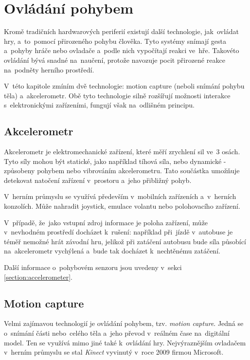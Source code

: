 \documentclass[thesis=B,czech,hidelinks]{FITthesis}[2012/06/26] %
\begin{document}
\section{Ovládání pohybem}

Kromě tradičních hardwarových periferií existují další technologie, jak~ovládat hry, a~to~pomocí přirozeného pohybu člověka. Tyto systémy snímají gesta a~pohyby hráče nebo ovladače a~podle nich vypočítají reakci ve~hře. Takovéto ovládání bývá snadné na~naučení, protože navozuje pocit přirozené reakce na~podněty herního prostředí.

V~této kapitole zmíním dvě technologie: motion capture (neboli snímání pohybu těla) a~akcelerometr. Obě tyto technologie silně rozšířují možnosti interakce s~elektronickými zařízeními, fungují však na~odlišném principu.

\subsection{Akcelerometr}

Akcelerometr je elektromechanické zařízení, které měří zrychlení sil ve~3 osách. Tyto síly mohou být statické, jako například tíhová síla, nebo dynamické - způsobeny pohybem nebo vibrováním akcelerometru.\cite{acc} Tato součástka umožňuje detekovat natočení zařízení v~prostoru a~jeho přibližný pohyb.

V~herním průmyslu se využívá především v~mobilních zařízeních a~v~herních konzolích. Může nahradit joystick, emulace volantu nebo polohovacího zařízení. 

V~případě, že~jako vstupní zdroj informace je poloha zařízení, může v~nevhodném prostředí docházet k~rušení: například při~jízdě v~autobuse je téměř nemožné hrát závodní hru, jelikož při zatáčení autobusu bude síla působící na~akcelerometr vychýlená a~bude tak docházet k~nechtěnému zatáčení.

Další informace o~pohybovém senzoru jsou uvedeny v~sekci \ref{section:accelerometer}.

\subsection{Motion capture}
\label{section:motion_capture}

Velmi zajímavou technologií je ovládání pohybem, tzv. \textit{motion capture}. Jedná se o~snímání části nebo~celého těla a~jeho převod v~reálném čase na~digitální model. Ten se využívá mimo jiné také k~ovládání hry. Nejvýraznějším ovladačem v~herním průmyslu se stal \textit{Kinect} vyvinutý v~roce 2009 firmou Microsoft. \cite{meetthekinect}
\end{document}
